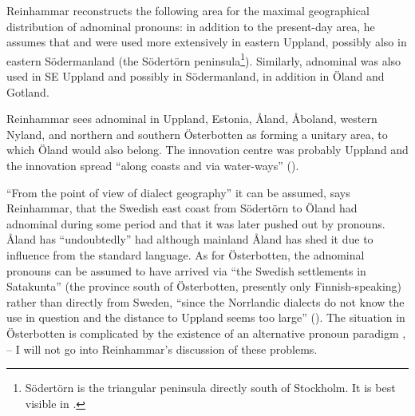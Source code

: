 Reinhammar reconstructs the following area for the maximal geographical distribution of adnominal pronouns: in addition to the present-day area, he assumes that  and  were used more extensively in eastern Uppland, possibly also in eastern Södermanland (the Södertörn peninsula\footnote{ Södertörn is the triangular peninsula directly south of Stockholm. It is best visible in .}). Similarly, adnominal was also used in SE Uppland and possibly in Södermanland, in addition in Öland and Gotland. 

Reinhammar sees adnominal in Uppland, Estonia, Åland, Åboland, western Nyland, and northern and southern Österbotten as forming a unitary area, to which Öland would also belong. The innovation centre was probably Uppland and the innovation spread “along coasts and via water-ways” (\citet[115]{Reinhammar1975}).

“From the point of view of dialect geography” it can be assumed, says Reinhammar, that the Swedish east coast from Södertörn to Öland had adnominal  during some period and that it was later pushed out by pronouns. Åland has “undoubtedly” had although mainland Åland has shed it due to influence from the standard language. As for Österbotten, the adnominal pronouns can be assumed to have arrived via “the Swedish settlements in Satakunta” (the province south of Österbotten, presently only Finnish-speaking) rather than directly from Sweden, “since the Norrlandic dialects do not know the use in question and the distance to Uppland seems too large” (\citet[116]{Reinhammar1975}). The situation in Österbotten is complicated by the existence of an alternative pronoun paradigm ,  – I will not go into Reinhammar’s discussion of these problems. 

